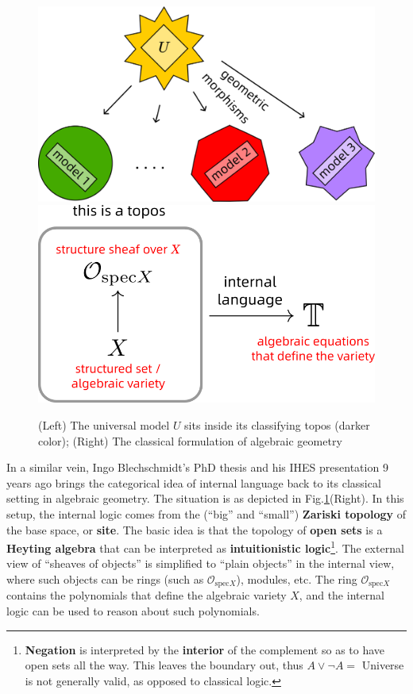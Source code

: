 \documentclass[runningheads]{llncs}
\begin{document}
\begin{figure}
	\includegraphics[scale=.25]{Caramello-picture.png} \qquad
	\includegraphics[scale=.5]{geometric-topos.png}
	\caption{(Left) The universal model $U$ sits inside its classifying topos (darker color); (Right) The classical formulation of algebraic geometry}
	\label{fig:Caramello-pic}
\end{figure}

In a similar vein, Ingo Blechschmidt's PhD thesis \cite{Blechschmidt2017} and his IHES presentation 9 years ago \cite{Blechschmidt-video2015} brings the categorical idea of internal language back to its classical setting in algebraic geometry.  The situation is as depicted in Fig.\ref{fig:Caramello-pic}(Right).  In this setup, the internal logic comes from the (``big'' and ``small'') \textbf{Zariski topology} of the base space, or \textbf{site}.  The basic idea is that the topology of \textbf{open sets} is a \textbf{Heyting algebra} that can be interpreted as \textbf{intuitionistic logic}\footnote{\textbf{Negation} is interpreted by the \textbf{interior} of the complement so as to have open sets all the way.  This leaves the boundary out, thus $A \vee \neg A =$ Universe is not generally valid, as opposed to classical logic.}.  The external view of ``sheaves of objects'' is simplified to ``plain objects'' in the internal view, where such objects can be rings (such as $\mathcal{O}_{\mathrm{spec} X}$), modules, etc.  The ring $\mathcal{O}_{\mathrm{spec} X}$ contains the polynomials that define the algebraic variety $X$, and the internal logic can be used to reason about such polynomials.
\end{document}
